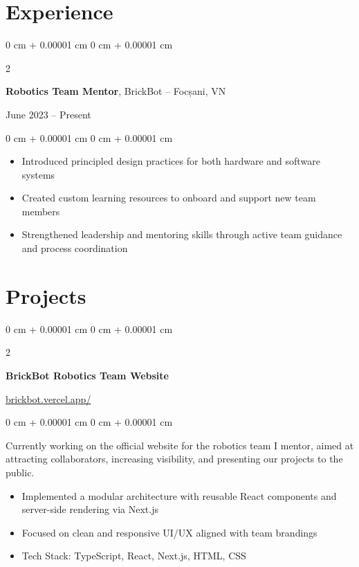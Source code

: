 \documentclass[10pt, letterpaper]{article}
\newenvironment{highlights}{
    \begin{itemize}[
        topsep=0.10 cm,
        parsep=0.10 cm,
        partopsep=0pt,
        itemsep=0pt,
        leftmargin=0 cm + 10pt
    ]
}{
    \end{itemize}
} %
\newenvironment{onecolentry}{
    \begin{adjustwidth}{
        0 cm + 0.00001 cm
    }{
        0 cm + 0.00001 cm
    }
}{
    \end{adjustwidth}
} %
\newenvironment{twocolentry}[2][]{
    \onecolentry
    \def\secondColumn{#2}
    \setcolumnwidth{\fill, 4.5 cm}
    \begin{paracol}{2}
}{
    \switchcolumn \raggedleft \secondColumn
    \end{paracol}
    \endonecolentry
} %
\begin{document}
    \section{Experience}
        
        \begin{twocolentry}{
    June 2023 – Present
}
    \textbf{Robotics Team Mentor}, BrickBot -- Focșani, VN
\end{twocolentry}

\vspace{0.10 cm}
\begin{onecolentry}
    \begin{highlights}
        \item Introduced principled design practices for both hardware and software systems
        \item Created custom learning resources to onboard and support new team members
        \item Strengthened leadership and mentoring skills through active team guidance and process coordination
    \end{highlights}
\end{onecolentry}


    
    \section{Projects}

        \begin{twocolentry}{
    \href{https://brickbot.vercel.app/en/home}{brickbot.vercel.app/}
}
    \textbf{BrickBot Robotics Team Website}
\end{twocolentry}

\vspace{0.10 cm}
\begin{onecolentry}
    Currently working on the official website for the robotics team I mentor, aimed at attracting collaborators, increasing visibility, and presenting our projects to the public.

    \begin{highlights}
        \item Implemented a modular architecture with reusable React components and server-side rendering via Next.js
        \item Focused on clean and responsive UI/UX aligned with team brandings
        \item Tech Stack: TypeScript, React, Next.js, HTML, CSS
    \end{highlights}
\end{onecolentry}
\end{document}
